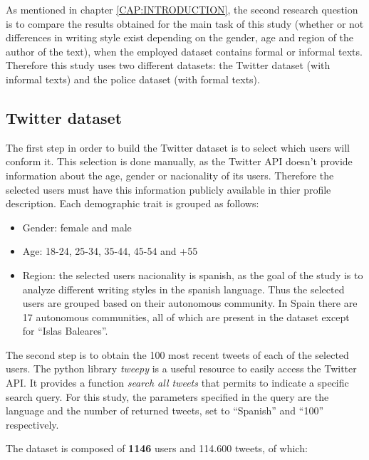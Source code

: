 As mentioned in chapter \ref{CAP:INTRODUCTION}, the second research question is to compare the results obtained for the main
task of this study (whether or not differences in writing style exist depending on the gender, age and region of the author of 
the text), when the employed dataset contains formal or informal texts. Therefore this study uses two different datasets: the 
Twitter dataset (with informal texts) and the police dataset (with formal texts).

\subsection{Twitter dataset}

The first step in order to build the Twitter dataset is to select which users will conform it. This selection is done manually, as the Twitter API doesn't provide information about the age, gender or nacionality of its users. Therefore the selected users must have this information publicly available in thier profile description. Each demographic trait is grouped as follows:
\begin{itemize}
    \item Gender: female and male
    \item Age: 18-24, 25-34, 35-44, 45-54 and +55
    \item Region: the selected users nacionality is spanish, as the goal of the study is to analyze different writing styles in the spanish language. Thus the selected users are grouped based on their autonomous community. In Spain there are 17 autonomous communities, all of which are present in the dataset except for ``Islas Baleares''.
\end{itemize}
The second step is to obtain the 100 most recent tweets of each of the selected users. The python library \textit{tweepy} is a useful resource to easily access the Twitter API. It provides a function \textit{search all tweets} that permits to indicate a specific search query. For this study, the parameters specified in the query are the language and the number of returned tweets, set to ``Spanish'' and ``100'' respectively. 

The dataset is composed of \textbf{1146} users and 114.600 tweets, of which:

